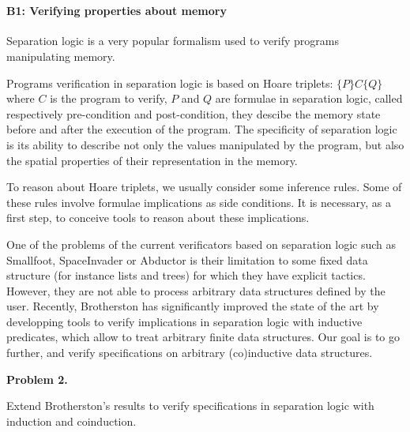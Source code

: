 \documentclass[11pt,twocolumn]{article}
\begin{document}
\medskip{}~\label{CircForVerif}


\paragraph{B1: Verifying properties about memory}

Separation logic \cite{Reynolds2002} is a very popular formalism used to verify programs manipulating memory.

Programs verification in separation logic is based on Hoare triplets: $\{P\} C \{Q\}$ where $C$ is the program to verify, $P$ and $Q$ are formulae in separation logic, called respectively pre-condition and post-condition, they descibe the memory state before and after the execution of the program. The specificity of separation logic is its ability to describe not only the values manipulated by the program, but also the spatial properties of their representation in the memory.

To reason about Hoare triplets, we usually consider some inference rules. Some of these rules
involve formulae implications as side conditions. It is necessary, as a first step, to conceive tools to reason about these implications.

One of the problems of the current verificators based on separation logic such as Smallfoot\cite{BerdineCO05},
SpaceInvader \cite{DistefanoOY06} or Abductor \cite{CalcagnoDOY11} is their limitation to some fixed data structure (for instance lists and trees) for which they have explicit tactics. However, they are not able to process arbitrary data structures defined by the user. Recently, Brotherston has significantly improved the state of the art by developping tools to verify implications in separation logic with inductive predicates, which allow to treat
arbitrary finite data structures. Our goal is to go further, and verify specifications on arbitrary (co)inductive data structures.


\begin{center}
\begin{bclogo}[logo= ,arrondi = 0.1, couleur = green!10,  epBarre = 0]{}
  \vspace{-10pt}
  \textbf{Problem 2.}

  Extend Brotherston's results to verify specifications in separation logic with induction and coinduction.
\end{bclogo}
\end{center}
\end{document}
